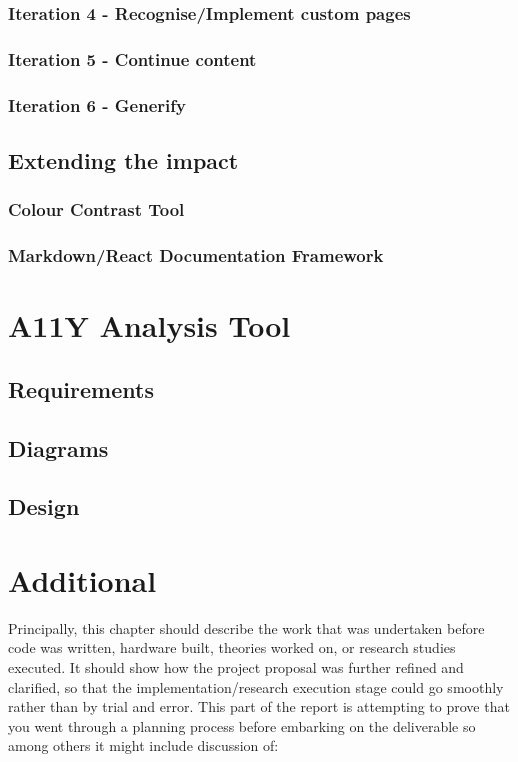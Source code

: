\subsubsection{Iteration 4 - Recognise/Implement custom pages}
\subsubsection{Iteration 5 - Continue content}
\subsubsection{Iteration 6 - Generify}

\subsection{Extending the impact}
\subsubsection{Colour Contrast Tool}
\subsubsection{Markdown/React Documentation Framework}

\section{A11Y Analysis Tool}
\subsection{Requirements}
\subsection{Diagrams}
\subsection{Design}

\section{Additional }


Principally, this chapter should describe the work that was undertaken before
code was written, hardware built, theories worked on, or research studies
executed. It should show how the project proposal was further refined and
clarified, so that the implementation/research execution stage could go
smoothly rather than by trial and error. This part of the report is attempting to
prove that you went through a planning process before embarking on the
deliverable so among others it might include discussion of:

